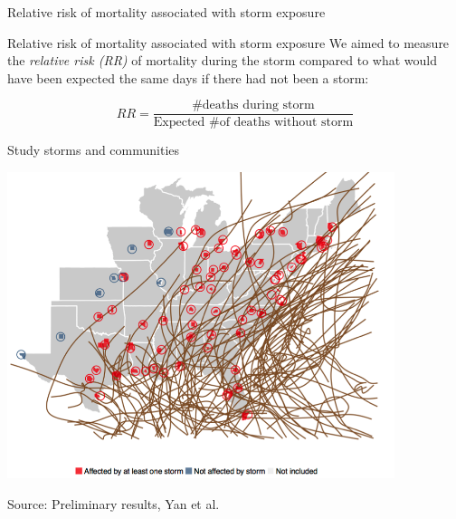\documentclass[ignorenonframetext,]{beamer}
\begin{document}
\begin{frame}{Relative risk of mortality associated with storm exposure}

\begin{block}{Relative risk of mortality associated with storm exposure}
We aimed to measure the \textit{relative risk (RR)} of mortality during the storm compared to what would have been expected the same days if there had not been a storm:

\begin{equation*}
RR = \frac{\text{\# deaths during storm}}{\text{Expected \# of deaths without storm}}
\end{equation*}

\end{block}

\end{frame}

\begin{frame}{Study storms and communities}

\begin{center}\includegraphics[width=0.85\textwidth]{figures/mortality_storms_counties} \end{center}

\footnotesize Source: Preliminary results, Yan et al.

\end{frame}
\end{document}

